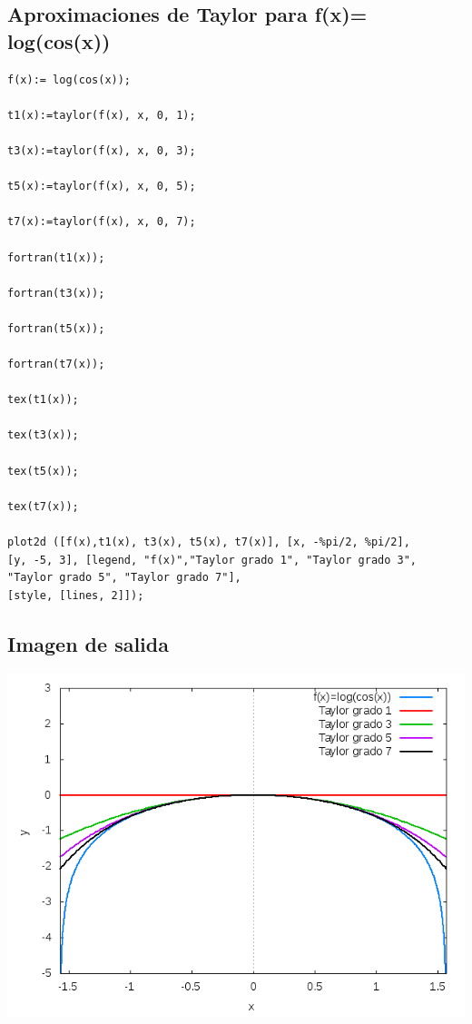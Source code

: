 \documentclass[letterpaper,10pt,twoside,onecolumn]{article}
\begin{document}
\subsection{Aproximaciones de Taylor para f(x)= log(cos(x))}
\begin{verbatim}
f(x):= log(cos(x));

t1(x):=taylor(f(x), x, 0, 1);

t3(x):=taylor(f(x), x, 0, 3);

t5(x):=taylor(f(x), x, 0, 5);

t7(x):=taylor(f(x), x, 0, 7);

fortran(t1(x));

fortran(t3(x));

fortran(t5(x));

fortran(t7(x));

tex(t1(x));

tex(t3(x));

tex(t5(x));

tex(t7(x));

plot2d ([f(x),t1(x), t3(x), t5(x), t7(x)], [x, -%pi/2, %pi/2],
[y, -5, 3], [legend, "f(x)","Taylor grado 1", "Taylor grado 3", 
"Taylor grado 5", "Taylor grado 7"],
[style, [lines, 2]]);
\end{verbatim}
\subsection{Imagen de salida}
\includegraphics[scale=.55]{LogCos.png}
\end{document}
